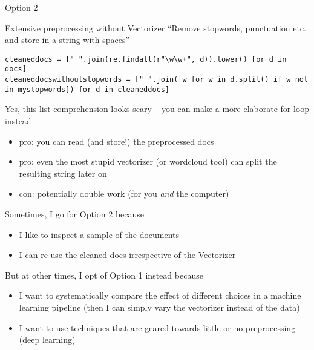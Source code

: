 \begin{frame}[fragile]{Option 2}
	\begin{block}{Extensive preprocessing without Vectorizer}
``Remove stopwords, punctuation etc. and store in a string with spaces''

\begin{lstlisting}
cleaneddocs = [" ".join(re.findall(r"\w\w+", d)).lower() for d in docs]
cleaneddocswithoutstopwords = [" ".join([w for w in d.split() if w not in mystopwords]) for d in cleaneddocs]
\end{lstlisting}
\begin{lstlistingoutputtiny}
\end{lstlistingoutputtiny}
{\tiny{Yes, this list comprehension looks scary -- you can make a more elaborate for loop instead}}
	
\begin{itemize}
	\item pro: you can read (and store!) the preprocessed docs
	\item pro: even the most stupid vectorizer (or wordcloud tool) can split the resulting string later on
	\item con: potentially double work (for you \emph{and} the computer)
\end{itemize}
\end{block}
\end{frame}



\begin{frame}[plain]
Sometimes, I go for Option 2 because
\begin{itemize}
	\item I like to inspect a sample of the documents
	\item I can re-use the cleaned docs irrespective of the Vectorizer
\end{itemize}

But at other times, I opt of Option 1 instead because
\begin{itemize}
	\item I want to systematically compare the effect of different choices in a machine learning pipeline (then I can simply vary the vectorizer instead of the data)
	\item I want to use techniques that are geared towards little or no preprocessing (deep learning)
\end{itemize}

\end{frame}


